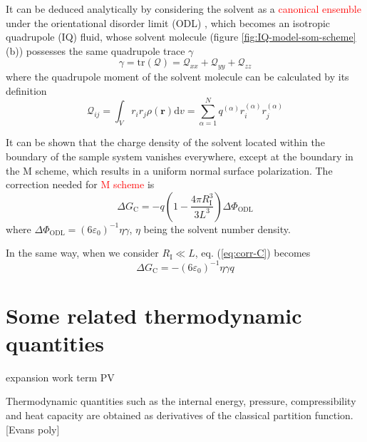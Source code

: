 It can be deduced analytically by considering the solvent as a \textcolor{red}{canonical
ensemble} under the orientational disorder limit (ODL) \citep{Kastenholz_2006_I},
which becomes an isotropic quadrupole (IQ) fluid, whose solvent molecule
(figure \ref{fig:IQ-model-som-scheme} (b)) possesses the same quadrupole
trace $\gamma$ 
\begin{equation}
\gamma=\mathrm{tr}(\mathbf{\mathcal{Q}})=\mathcal{Q}_{xx}+\mathcal{Q}_{yy}+\mathcal{Q}_{zz}
\end{equation}
where the quadrupole moment of the solvent molecule can be calculated
by its definition \citep{Multipole}
\begin{equation}
\mathcal{Q}_{ij}=\int_{V}r_{i}r_{j}\rho(\mathbf{r})\mathrm{d}v=\sum_{\alpha=1}^{N}q^{(\alpha)}r_{i}^{(\alpha)}r_{j}^{(\alpha)}
\end{equation}

It can be shown that the charge density of the solvent located within
the boundary of the sample system vanishes everywhere, except at the
boundary in the M scheme, which results in a uniform normal surface
polarization. The correction needed for\textcolor{red}{{} M scheme }is
\begin{equation}
\Delta G_{\mathrm{C}}=-q\left(1-\frac{4\pi R_{\mathrm{I}}^{3}}{3L^{3}}\right)\Delta\Phi_{\mathrm{ODL}}\label{eq:corr-C}
\end{equation}
where $\Delta\Phi_{\mathrm{ODL}}=\left(6\varepsilon_{0}\right)^{-1}\eta\gamma$,
$\eta$ being the solvent number density.

In the same way, when we consider $R_{\mathrm{I}}\ll L$, eq. (\ref{eq:corr-C})
becomes
\begin{equation}
\Delta G_{\mathrm{C}}=-\left(6\varepsilon_{0}\right)^{-1}\eta\gamma q
\end{equation}


\section{Some related thermodynamic quantities}

\textquotedbl{}expansion work\textquotedbl{} term PV

Thermodynamic quantities such as the internal energy, pressure, compressibility
and heat capacity are obtained as derivatives of the classical partition
function. {[}Evans poly{]}

